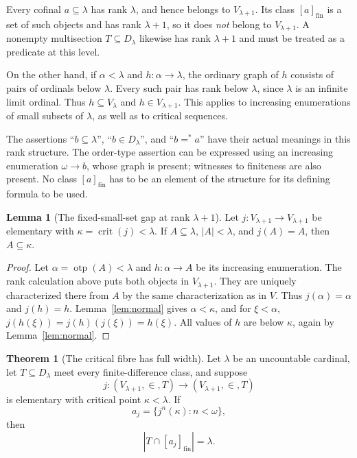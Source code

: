 \documentclass[11pt,letterpaper]{article}
\theoremstyle{definition}
\newtheorem{theorem}[definition]{Theorem}
\newtheorem{lemma}[definition]{Lemma}
\numberwithin{equation}{section}
\newcommand{\crit}{\operatorname{crit}}
\newcommand{\eqfin}{\mathrel{=^{*}}}
\newcommand{\cl}[1]{[#1]_{\mathrm{fin}}}
\newcommand{\otp}{\operatorname{otp}}
\begin{document}
Every cofinal $a\subseteq\lambda$ has rank $\lambda$, and hence belongs to $V_{\lambda+1}$. Its class $\cl a$ is a set of such objects and has rank $\lambda+1$, so it does \emph{not} belong to $V_{\lambda+1}$. A nonempty multisection $T\subseteq D_\lambda$ likewise has rank $\lambda+1$ and must be treated as a predicate at this level.

On the other hand, if $\alpha<\lambda$ and $h:\alpha\to\lambda$, the ordinary graph of $h$ consists of pairs of ordinals below $\lambda$. Every such pair has rank below $\lambda$, since $\lambda$ is an infinite limit ordinal. Thus $h\subseteq V_\lambda$ and $h\in V_{\lambda+1}$. This applies to increasing enumerations of small subsets of $\lambda$, as well as to critical sequences.

The assertions ``$b\subseteq\lambda$'', ``$b\in D_\lambda$'', and ``$b\eqfin a$'' have their actual meanings in this rank structure. The order-type assertion can be expressed using an increasing enumeration $\omega\to b$, whose graph is present; witnesses to finiteness are also present. No class $\cl a$ has to be an element of the structure for its defining formula to be used.

\begin{lemma}[The fixed-small-set gap at rank $\lambda+1$]\label{lem:localfixed}
Let $j:V_{\lambda+1}\to V_{\lambda+1}$ be elementary with $\kappa=\crit(j)<\lambda$. If $A\subseteq\lambda$, $|A|<\lambda$, and $j(A)=A$, then $A\subseteq\kappa$.
\end{lemma}

\begin{proof}
Let $\alpha=\otp(A)<\lambda$ and $h:\alpha\to A$ be its increasing enumeration. The rank calculation above puts both objects in $V_{\lambda+1}$. They are uniquely characterized there from $A$ by the same characterization as in $V$. Thus $j(\alpha)=\alpha$ and $j(h)=h$. Lemma~\ref{lem:normal} gives $\alpha<\kappa$, and for $\xi<\alpha$,
$j(h(\xi))=j(h)(j(\xi))=h(\xi)$. All values of $h$ are below $\kappa$, again by Lemma~\ref{lem:normal}.
\end{proof}

\begin{theorem}[The critical fibre has full width]\label{thm:local}
Let $\lambda$ be an uncountable cardinal, let $T\subseteq D_\lambda$ meet every finite-difference class, and suppose
\[
 j:(V_{\lambda+1},\in,T)\longrightarrow(V_{\lambda+1},\in,T)
\]
is elementary with critical point $\kappa<\lambda$. If
\[
 a_j=\{j^n(\kappa):n<\omega\},
\]
then
\begin{equation}\label{eq:criticalfibre}
 |T\cap\cl{a_j}|=\lambda.
\end{equation}
\end{theorem}
\end{document}
